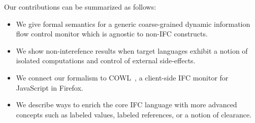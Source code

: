 

Our contributions can be summarized as follows:
\begin{itemize}
  \item We give formal semantics for a generic coarse-grained dynamic
    information flow control monitor which is agnostic to non-IFC constructs.
  \item We show non-interefence results when target languages exhibit a notion
    of isolated computations and control of external side-effects.
  \item
  We connect our formalism to COWL~\cite{swapi}, a
  client-side IFC monitor for JavaScript in Firefox.
  \item We describe ways to enrich the core IFC language with
  more advanced concepts such as labeled values, labeled references, or a
  notion of clearance. %
\end{itemize}


